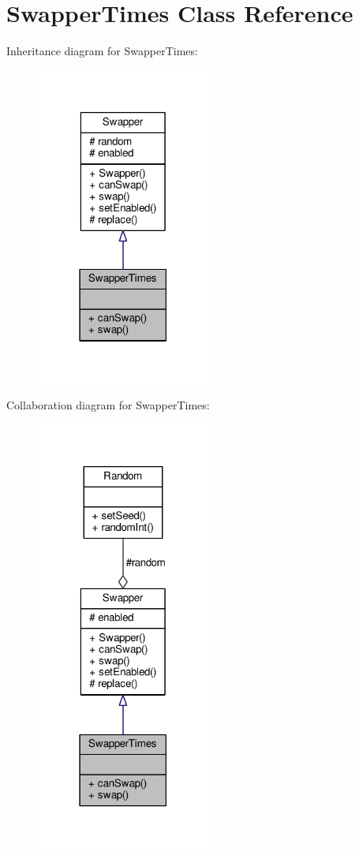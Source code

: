 \hypertarget{classSwapperTimes}{}\section{Swapper\+Times Class Reference}
\label{classSwapperTimes}


Inheritance diagram for Swapper\+Times\+:
\nopagebreak
\begin{figure}[H]
\begin{center}
\leavevmode
\includegraphics[width=162pt]{classSwapperTimes__inherit__graph}
\end{center}
\end{figure}


Collaboration diagram for Swapper\+Times\+:
\nopagebreak
\begin{figure}[H]
\begin{center}
\leavevmode
\includegraphics[width=162pt]{classSwapperTimes__coll__graph}
\end{center}
\end{figure}
